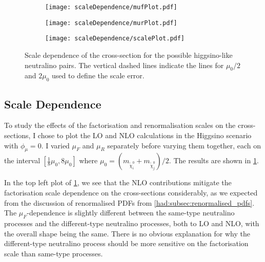 \documentclass[../main.tex]{subfiles}
\begin{document}
\begin{figure}[ht!]
  \centering
  \begin{subfigure}{0.49\textwidth}
    \centering
    \texttt{[image: scaleDependence/mufPlot.pdf]}
    \caption{}
  \end{subfigure}
  \begin{subfigure}{0.49\textwidth}
    \centering
    \texttt{[image: scaleDependence/murPlot.pdf]}
    \caption{}
  \end{subfigure}
  \begin{subfigure}{0.49\textwidth}
    \centering
    \texttt{[image: scaleDependence/scalePlot.pdf]}
    \caption{}
  \end{subfigure}
  \caption{Scale dependence of the cross-section for the possible higgsino-like neutralino pairs. The vertical dashed lines indicate the lines for \(\mu_0/2\) and \(2\mu_0\) used to define the scale error.}
  \label{res:fig:scale_dependence}
\end{figure}
\subsection{Scale Dependence}
\label{res:subsec:scale_dependence}
To study the effects of the factorisation and renormalisation scales on the cross-sections, I chose to plot the LO and NLO calculations in the Higgsino scenario with \(\phi_\mu = 0\).
I varied \(\mu_F\) and \(\mu_R\) separately before varying them together, each on the interval \([\frac{1}{8}\mu_0, 8\mu_0]\) where \(\mu_0 = (m_{\tilde\chi^0_i} + m_{\tilde\chi^0_j}) / 2\).
The results are shown in \cref{res:fig:scale_dependence}.
\medskip

In the top left plot of \cref{res:fig:scale_dependence}, we see that the NLO contributions mitigate the factorisation scale dependence on the cross-sections considerably, as we expected from the discussion of renormalised PDFs from \cref{had:subsec:renormalised_pdfs}.
The \(\mu_F\)-dependence is slightly different between the same-type neutralino processes and the different-type neutralino processes, both to LO and NLO, with the overall shape being the same.
There is no obvious explanation for why the different-type neutralino process should be more sensitive on the factorisation scale than same-type processes.
\end{document}
